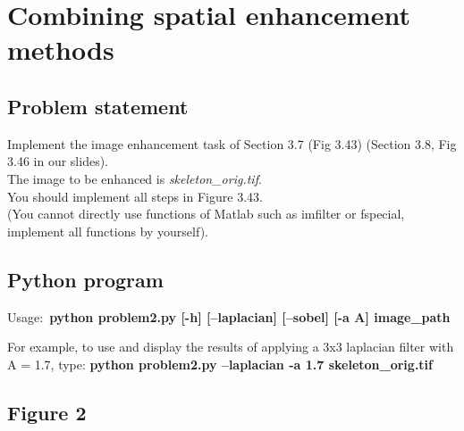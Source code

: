 \chapter{Combining spatial enhancement methods}

\section{Problem statement}

Implement the image enhancement task of Section 3.7 (Fig 3.43) (Section 3.8, Fig 3.46 in our slides).\\
The image to be enhanced is \textit{skeleton\_orig.tif}.\\
You should implement all steps in Figure 3.43. \\
(You cannot directly use functions of Matlab such as imfilter or fspecial,
implement all functions by yourself).

\section{Python program}

Usage:~\textbf{python problem2.py [-h] [--laplacian] [--sobel] [-a A] image\_path}

For example, to use and display the results of applying a 3x3 laplacian filter with A = 1.7, type:
\textbf{python problem2.py --laplacian -a 1.7 skeleton_orig.tif}

\section{Figure 2}
